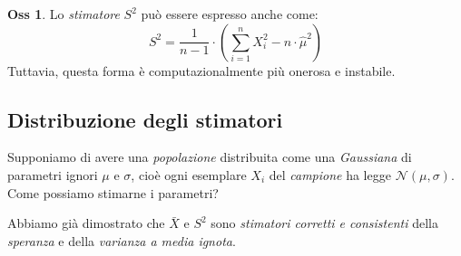 \documentclass[12pt, a4paper]{report}
\theoremstyle{definition}
\newtheorem*{observation}{Oss}
\DeclareRobustCommand{\norm}{\mathcal{N}}
\begin{document}
\begin{observation}
	Lo \emph{stimatore} $S^2$ può essere espresso anche come:
	\[S^2=\frac{1}{n-1}\cdot \left(\sum_{i=1}^nX_i^2-n\cdot \hat{\mu}^2\right)\]
	Tuttavia, questa forma è computazionalmente più onerosa e instabile.
\end{observation}

\subsection{Distribuzione degli stimatori}
Supponiamo di avere una \emph{popolazione} distribuita come una \emph{Gaussiana}
di parametri ignori $\mu$ e $\sigma$, cioè ogni esemplare $X_i$ del \emph{campione}
ha legge $\norm(\mu, \sigma)$. Come possiamo stimarne i parametri?

Abbiamo già dimostrato che $\bar{X}$ e $S^2$ sono \emph{stimatori corretti e
consistenti} della \emph{speranza} e della \emph{varianza a media ignota}.
\end{document}
